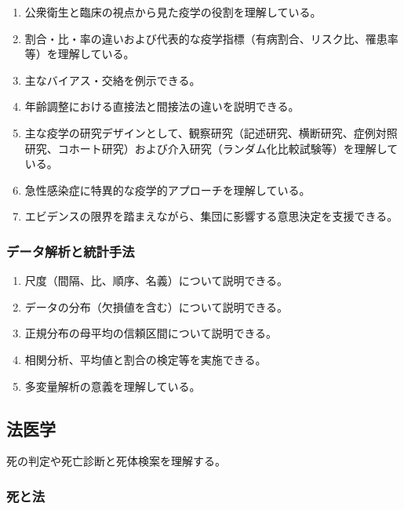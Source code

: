 \begin{enumerate}
\def\labelenumi{\arabic{enumi}.}
\tightlist
\item
  公衆衛生と臨床の視点から見た疫学の役割を理解している。
\item
  割合・比・率の違いおよび代表的な疫学指標（有病割合、リスク比、罹患率等）を理解している。
\item
  主なバイアス・交絡を例示できる。
\item
  年齢調整における直接法と間接法の違いを説明できる。
\item
  主な疫学の研究デザインとして、観察研究（記述研究、横断研究、症例対照研究、コホート研究）および介入研究（ランダム化比較試験等）を理解している。
\item
  急性感染症に特異的な疫学的アプローチを理解している。
\item
  エビデンスの限界を踏まえながら、集団に影響する意思決定を支援できる。
\end{enumerate}

\hypertarget{ux30c7ux30fcux30bfux89e3ux6790ux3068ux7d71ux8a08ux624bux6cd5}{%
\subsubsection{データ解析と統計手法}\label{ux30c7ux30fcux30bfux89e3ux6790ux3068ux7d71ux8a08ux624bux6cd5}}

\begin{enumerate}
\def\labelenumi{\arabic{enumi}.}
\tightlist
\item
  尺度（間隔、比、順序、名義）について説明できる。
\item
  データの分布（欠損値を含む）について説明できる。
\item
  正規分布の母平均の信頼区間について説明できる。
\item
  相関分析、平均値と割合の検定等を実施できる。
\item
  多変量解析の意義を理解している。
\end{enumerate}

\hypertarget{ux6cd5ux533bux5b66}{%
\subsection{法医学}\label{ux6cd5ux533bux5b66}}

死の判定や死亡診断と死体検案を理解する。

\hypertarget{ux6b7bux3068ux6cd5}{%
\subsubsection{死と法}\label{ux6b7bux3068ux6cd5}}


